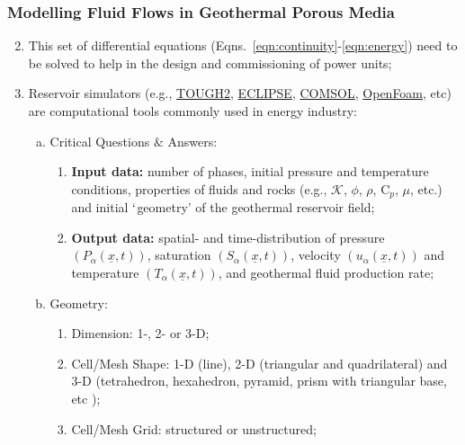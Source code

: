 \documentclass[10pt,compress,unknownkeysallowed]{beamer}
\begin{document}
\begin{frame}
 \frametitle{Modelling Fluid Flows in Geothermal Porous Media}
         \begin{enumerate}[1.]\setcounter{enumi}{1}\scriptsize
            \item <1-> This set of differential equations (Eqns.~\ref{eqn:continuity}-\ref{eqn:energy}) need to be solved to help in the design and commissioning of power units;
            \item <2-> Reservoir simulators (e.g., \href{http://esd1.lbl.gov/research/projects/tough/software/tough2.html}{TOUGH2}, \href{http://www.software.slb.com/products/foundation/pages/eclipse.aspx}{ECLIPSE}, \href{http://www.uk.comsol.com/}{COMSOL}, \href{http://www.openfoam.com/} {OpenFoam}, etc) are computational tools commonly used in energy industry:
               \begin{enumerate}[(a)]\scriptsize
                   \item <3-> Critical Questions $\&$ Answers:
                       \begin{enumerate}[{a.}i)]\scriptsize
                          \item <4-> {\bf Input data:} number of phases, initial pressure and temperature conditions, properties of fluids and rocks (e.g., $\mathcal{K}$, $\phi$, $\rho$, C$_{p}$, $\mu$, etc.) and initial $\lq$geometry' of the geothermal reservoir field;
                          \item <5-> {\bf Output data:} spatial- and time-distribution of pressure $\left(P_{\alpha}\left(\underline{x},t\right)\right)$, saturation $\left(S_{\alpha}\left(\underline{x},t\right)\right)$, velocity $\left(u_{\alpha}\left(\underline{x},t\right)\right)$ and  temperature $\left(T_{\alpha}\left(\underline{x},t\right)\right)$, and geothermal fluid production rate;
                       \end{enumerate}
                   \item <6-> Geometry:
                       \begin{enumerate}[{b.}i)]\scriptsize
                          \item <6-> Dimension: 1-, 2- or 3-D;
                          \item <6-> Cell/Mesh Shape: 1-D (line), 2-D (triangular and quadrilateral) and 3-D (tetrahedron, hexahedron, pyramid, prism with triangular base, etc );
                          \item <6-> Cell/Mesh Grid: structured or unstructured;

\end{enumerate}
\end{enumerate}
\end{enumerate}
\end{frame}
\end{document}
